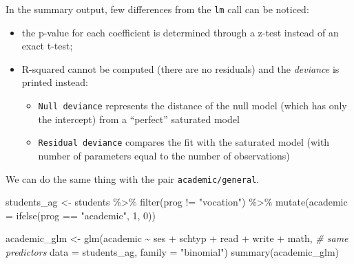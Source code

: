 \documentclass[
  oneside]{book}
\newenvironment{Shaded}{\begin{snugshade}}{\end{snugshade}}
\newcommand{\AttributeTok}[1]{\textcolor[rgb]{0.77,0.63,0.00}{#1}}
\newcommand{\CommentTok}[1]{\textcolor[rgb]{0.56,0.35,0.01}{\textit{#1}}}
\newcommand{\DecValTok}[1]{\textcolor[rgb]{0.00,0.00,0.81}{#1}}
\newcommand{\FunctionTok}[1]{\textcolor[rgb]{0.00,0.00,0.00}{#1}}
\newcommand{\NormalTok}[1]{#1}
\newcommand{\OtherTok}[1]{\textcolor[rgb]{0.56,0.35,0.01}{#1}}
\newcommand{\SpecialCharTok}[1]{\textcolor[rgb]{0.00,0.00,0.00}{#1}}
\newcommand{\StringTok}[1]{\textcolor[rgb]{0.31,0.60,0.02}{#1}}
\providecommand{\tightlist}{%
  \setlength{\itemsep}{0pt}\setlength{\parskip}{0pt}}
\begin{document}
In the summary output, few differences from the \texttt{lm} call
can be noticed:

\begin{itemize}
\tightlist
\item
  the p-value for each coefficient is determined through a z-test
  instead of an exact t-test;
\item
  R-squared cannot be computed (there are no residuals) and the
  \emph{deviance} is printed instead:

  \begin{itemize}
  \tightlist
  \item
    \texttt{Null\ deviance} represents the distance of the null model
    (which has only the intercept) from a ``perfect'' saturated model
  \item
    \texttt{Residual\ deviance} compares the fit with the saturated model (with number
    of parameters equal to the number of observations)
  \end{itemize}
\end{itemize}

We can do the same thing with the pair \texttt{academic/general}.

\begin{Shaded}
\begin{Highlighting}[]
\NormalTok{students\_ag }\OtherTok{\textless{}{-}}\NormalTok{ students }\SpecialCharTok{\%\textgreater{}\%}
  \FunctionTok{filter}\NormalTok{(prog }\SpecialCharTok{!=} \StringTok{"vocation"}\NormalTok{) }\SpecialCharTok{\%\textgreater{}\%}
  \FunctionTok{mutate}\NormalTok{(}\AttributeTok{academic =} \FunctionTok{ifelse}\NormalTok{(prog }\SpecialCharTok{==} \StringTok{"academic"}\NormalTok{, }\DecValTok{1}\NormalTok{, }\DecValTok{0}\NormalTok{))}

\NormalTok{academic\_glm }\OtherTok{\textless{}{-}} \FunctionTok{glm}\NormalTok{(academic }\SpecialCharTok{\textasciitilde{}}\NormalTok{ ses }\SpecialCharTok{+}\NormalTok{ schtyp }\SpecialCharTok{+}\NormalTok{ read }\SpecialCharTok{+}\NormalTok{ write }\SpecialCharTok{+}\NormalTok{ math, }\CommentTok{\# same predictors}
      \AttributeTok{data =}\NormalTok{ students\_ag, }\AttributeTok{family =} \StringTok{"binomial"}\NormalTok{)}
\FunctionTok{summary}\NormalTok{(academic\_glm)}
\end{Highlighting}
\end{Shaded}
\end{document}
